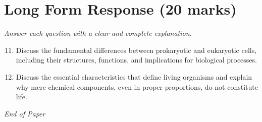 \documentclass[12pt]{article}
\begin{document}
\section*{Long Form Response (20 marks)}
\textit{Answer each question with a clear and complete explanation.}
\begin{enumerate}[label=\arabic*.]
\setcounter{enumi}{10}
\item Discuss the fundamental differences between prokaryotic and eukaryotic cells, including their structures, functions, and implications for biological processes.
\item Discuss the essential characteristics that define living organisms and explain why mere chemical components, even in proper proportions, do not constitute life.
\end{enumerate}

\vfill
\noindent\textit{End of Paper}
\end{document}
